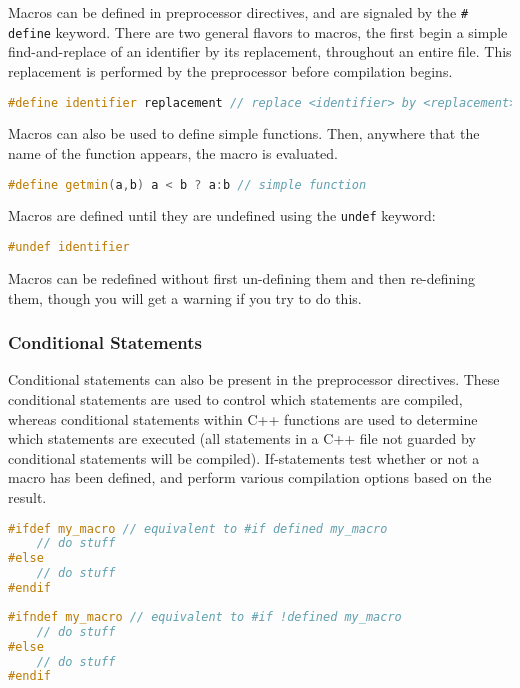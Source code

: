 \documentclass[10pt]{article}
\begin{document}
Macros can be defined in preprocessor directives, and are signaled by the \texttt{\# define} keyword. There are two general flavors to macros, the first begin a simple find-and-replace of an identifier by its replacement, throughout an entire file. This replacement is performed by the preprocessor before compilation begins.

\begin{lstlisting}[language=C++]
#define identifier replacement // replace <identifier> by <replacement>
\end{lstlisting}

Macros can also be used to define simple functions. Then, anywhere that the name of the function appears, the macro is evaluated. 

\begin{lstlisting}[language=C++]
#define getmin(a,b) a < b ? a:b // simple function
\end{lstlisting}

Macros are defined until they are undefined using the \texttt{undef} keyword:

\begin{lstlisting}[language=C++]
#undef identifier
\end{lstlisting}

Macros can be redefined without first un-defining them and then re-defining them, though you will get a warning if you try to do this.

\subsubsection{Conditional Statements}

Conditional statements can also be present in the preprocessor directives. These conditional statements are used to control which statements are compiled, whereas conditional statements within C++ functions are used to determine which statements are executed (all statements in a C++ file not guarded by conditional statements will be compiled). If-statements test whether or not a macro has been defined, and perform various compilation options based on the result.

\begin{lstlisting}[language=C++]
#ifdef my_macro // equivalent to #if defined my_macro
	// do stuff
#else
	// do stuff
#endif
\end{lstlisting}

\begin{lstlisting}[language=C++]
#ifndef my_macro // equivalent to #if !defined my_macro
	// do stuff
#else
	// do stuff
#endif
\end{lstlisting}
\end{document}
